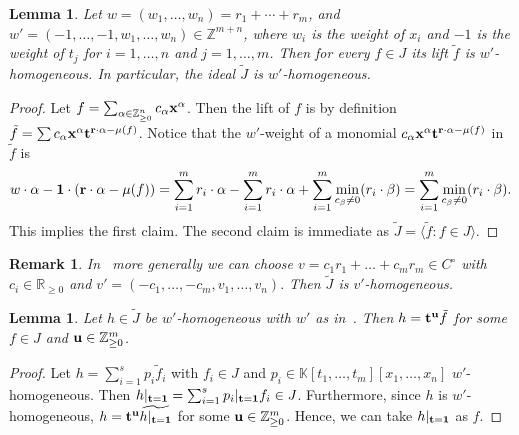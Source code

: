 \documentclass[pdftex]{sigma}%
\newtheorem{Lemma}[Theorem]{Lemma}
\newtheorem{Remark}[Theorem]{Remark}}
\numberwithin{equation}{section}
\begin{document}
\begin{Lemma}
Let $w=(w_1,\dots,w_n)=r_1+\cdots+r_m$, and $w' = (-1,\ldots,-1,w_1,\ldots,w_n)\in \mathbb{Z}^{m+n}$, where $w_i$ is the weight of $x_i$ and $-1$ is the weight of $t_j$ for $i=1,\ldots,n$ and $j=1,\ldots,m$.
Then for every $f\in J$ its lift $\tilde f$ is $w'$-homogeneous.
In particular, the ideal $\tilde{J}$ is ${w'}$-homogeneous.
\end{Lemma}
\begin{proof}
Let $f=\sum_{\alpha\in \mathbb Z_{\ge 0}^n} c_\alpha{\bf x}^{\alpha}$.
Then the lift of $f$ is by definition $\tilde f=\sum c_\alpha{\bf x}^\alpha{\bf t}^{{\bf r}\cdot \alpha-\mu(f)}$.
Notice that the $w'$-weight of a monomial $c_\alpha{\bf x}^\alpha{\bf t}^{{\bf r}\cdot \alpha-\mu(f)}$ in $\tilde f$ is
\begin{displaymath}
w\cdot \alpha -{\bf 1}\cdot ({\bf r}\cdot \alpha-\mu(f)) = \sum_{i=1}^m r_i\cdot \alpha - \sum_{i=1}^m r_i\cdot \alpha + \sum_{i=1}^m \min_{c_\beta\not=0}(r_i\cdot \beta) = \sum_{i=1}^m \min_{c_\beta\not=0}(r_i\cdot \beta).
\end{displaymath}
This implies the first claim. The second claim is immediate as $\tilde J=\langle \tilde f\colon f\in J\rangle$.
\end{proof}

\begin{Remark}
In~ more generally we can choose
$v=c_1r_1+\dots+c_mr_m\in C^\circ$ with $c_i\in \mathbb R_{\ge 0}$ and $v'=(-c_1,\dots,-c_m,v_1,\dots,v_n).$
Then $\tilde J$ is $v'$-homogeneous.
\end{Remark}

\begin{Lemma}
Let $h\in \tilde J$ be $w'$-homogeneous with $w'$ as in~.
Then $h={\bf t}^{\bf u}\tilde{f}$ for some $f\in J$ and ${\bf u}\in \mathbb{Z}_{\geq 0}^m$.
\end{Lemma}

\begin{proof}
Let $h=\sum_{i=1}^s{p_i}\tilde{f}_i$ with $f_i\in J$ and $p_i\in\mathbb{K}[t_1,\ldots,t_m][x_1,\ldots,x_n]$ $w'$-homogeneous.
Then
$h\vert_{{\bf t}={\bf 1}}=\sum_{i=1}^s p_i\vert_{{\bf t}={\bf 1}}f_i\in J$. Furthermore, since $h$ is $w'$-homogeneous, $h={\bf t}^{\bf u}\widetilde{h\vert_{{\bf t}={\bf 1}}}$ for some ${\bf u}\in \mathbb{Z}_{\geq 0}^m$. Hence, we can take $h\vert_{{\bf t}={\bf 1}}$ as $f$.
\end{proof}
\end{document}
